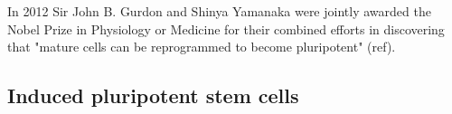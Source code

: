 In 2012 Sir John B. Gurdon and Shinya Yamanaka were jointly awarded the Nobel Prize in Physiology or Medicine for their combined efforts in discovering that "mature cells can be reprogrammed to become pluripotent" (ref).    















\subsection{Induced pluripotent stem cells}
\label{sec:ipsc}


